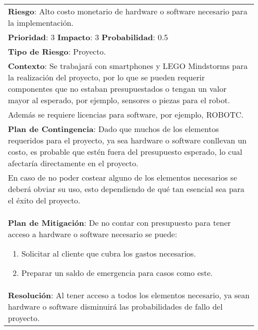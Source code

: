 \begin{table}[htbp!]
  \begin{tabular}{|p{15cm}|}\hline
    {\bf Riesgo}: Alto costo monetario de hardware o software necesario para la implementaci\'on.\\%
    {\bf Prioridad}: 3  {\bf Impacto}: 3  {\bf Probabilidad}: 0.5\\%
    {\bf Tipo de Riesgo}: Proyecto.\\%
    {\bf Contexto}: Se trabajar\'a con smartphones y LEGO Mindstorms para la realizaci\'on del proyecto, por lo que se pueden requerir componentes que no estaban presupuestados o tengan un valor mayor  al esperado, por ejemplo, sensores o piezas para el robot.\\Adem\'as se requiere licencias para software, por ejemplo, ROBOTC.\\%
    {\bf Plan de Contingencia}: Dado que muchos de los elementos requeridos para el proyecto, ya sea hardware o software conllevan un costo, es probable que est\'en fuera del presupuesto esperado, lo cual afectar\'ia directamente en el proyecto.\\En caso de no poder costear alguno de los elementos necesarios se deber\'a obviar su uso, esto dependiendo de qu\'e tan esencial sea para el \'exito del proyecto.\\%
    {\bf Plan de Mitigaci\'on}: De no contar con presupuesto para tener acceso a hardware o software necesario se puede:\begin{enumerate}\item Solicitar al cliente que cubra los gastos necesarios.\item Preparar un saldo de emergencia para casos como este.\end{enumerate}\\%
    {\bf Resoluci\'on}: Al tener acceso a todos los elementos necesario, ya sean hardware o software disminuir\'a las probabilidades de fallo del proyecto.\\\hline
  \end{tabular}
  \caption{}
  \label{table:R8}
\end{table}

\newpage

